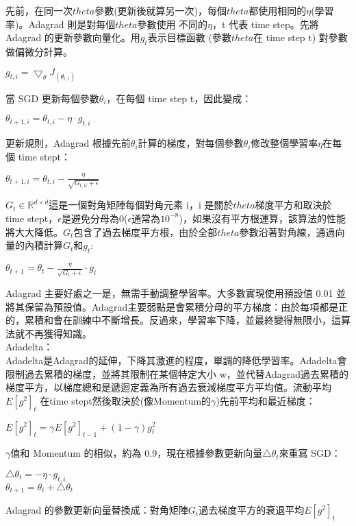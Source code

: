 \begin{itemize}
 先前，在同一次$theta$參數(更新後就算另一次)，每個$theta$都使用相同的$\eta$(學習率)。Adagrad 則是對每個$theta$參數使用 不同的$\eta$，t 代表 time step。先將 Adagrad 的更新參數向量化。用$g_t$表示目標函數 (參數$theta$在 time step t) 對參數做偏微分計算。
\begin{center}
$g_{t,i}=\bigtriangledown_{\theta}J_{(\theta_{t,i})}$
\end{center}
當 SGD 更新每個參數$\theta_i$，在每個 time step t，因此變成：
\begin{center}
$\theta_{t+1,i}=\theta_{t,i}-\eta\cdot g_{t,i}$
\end{center}
更新規則，Adagrad 根據先前$\theta_i$計算的梯度，對每個參數$\theta_i$修改整個學習率$\eta$在每個 time stept：
\begin{center}
$\theta_{t+1,i}=\theta_{t,i}-\frac{\eta}{\sqrt{G_{t,ii}+\epsilon}}$
\end{center}
$G_t \in \mathbb{R}^{d\times d}$這是一個對角矩陣每個對角元素 i，i 是關於$theta$梯度平方和取決於 time stept，$\epsilon$是避免分母為0($\epsilon$通常為$10^{-8}$)，如果沒有平方根運算，該算法的性能將大大降低。$G_t$包含了過去梯度平方根，由於全部$theta$參數沿著對角線，通過向量的內積計算$G_t$和$g_t$:
\begin{center}
$\theta_{t+1}=\theta_{t}-\frac{\eta}{\sqrt{G_{t}+\epsilon}}\cdot g_t$
\end{center}
 Adagrad 主要好處之一是，無需手動調整學習率。大多數實現使用預設值 0.01 並將其保留為預設值。Adagrad主要弱點是會累積分母的平方梯度：由於每項都是正的，累積和會在訓練中不斷增長。反過來，學習率下降，並最終變得無限小，這算法就不再獲得知識。\\
Adadelta：\\
 Adadelta是Adagrad的延伸，下降其激進的程度，單調的降低學習率。Adadelta會限制過去累積的梯度，並將其限制在某個特定大小 w，並代替Adagrad過去累積的梯度平方，以梯度總和是遞迴定義為所有過去衰減梯度平方平均值。流動平均$E[g^2]_t$ 在time stept然後取決於(像Momentum的$\gamma$)先前平均和最近梯度：
\begin{center}
$E[g^2]_t=\gamma E[g^2]_{t-1}+(1-\gamma)g^2 _t$
\end{center}
$\gamma$值和 Momentum 的相似，約為 0.9，現在根據參數更新向量$\bigtriangleup\theta_t$來重寫 SGD：
\begin{center}
$\bigtriangleup\theta_t=-\eta\cdot g_{t,i}$\\
$\theta_{t+1}=\theta_t+\bigtriangleup\theta_t$
\end{center}
Adagrad 的參數更新向量替換成：對角矩陣$G_t$過去梯度平方的衰退平均$E[g^2]_t$
\begin{center}

\end{center}
\end{itemize}
